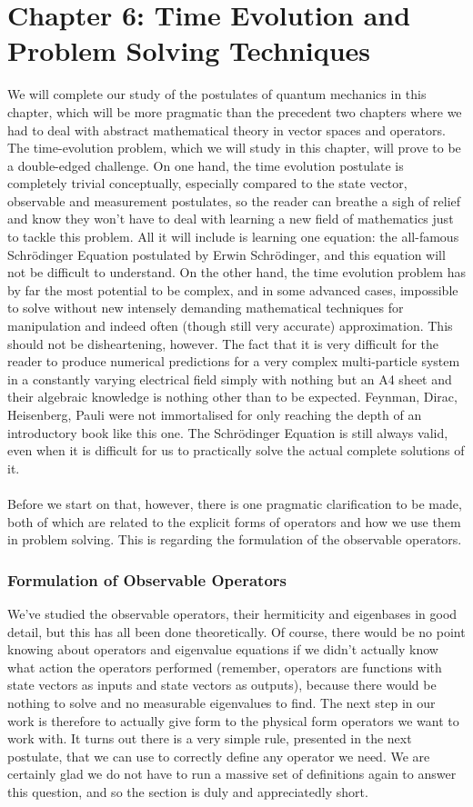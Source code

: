 \chapter{Chapter 6: Time Evolution and Problem Solving Techniques}
We will complete our study of the postulates of quantum mechanics in this chapter, which will be more pragmatic than the precedent two chapters where we had to deal with abstract mathematical theory in vector spaces and operators. The time-evolution problem, which we will study in this chapter, will prove to be a double-edged challenge. On one hand, the time evolution postulate is completely trivial conceptually, especially compared to the state vector, observable and measurement postulates, so the reader can breathe a sigh of relief and know they won't have to deal with learning a new field of mathematics just to tackle this problem. All it will include is learning one equation: the all-famous Schr\"{o}dinger Equation postulated by Erwin Schr\"{o}dinger, and this equation will not be difficult to understand. On the other hand, the time evolution problem has by far the most potential to be complex, and in some advanced cases, impossible to solve without new intensely demanding mathematical techniques for manipulation and indeed often (though still very accurate) approximation. This should not be disheartening, however. The fact that it is very difficult for the reader to produce numerical predictions for a very complex multi-particle system in a constantly varying electrical field simply with nothing but an A4 sheet and their algebraic knowledge is nothing other than to be expected. Feynman, Dirac, Heisenberg, Pauli were not immortalised for only reaching the depth of an introductory book like this one. The Schr\"{o}dinger Equation is still always valid, even when it is difficult for us to practically solve the actual complete solutions of it.
\\\\
Before we start on that, however, there is one pragmatic clarification to be made, both of which are related to the explicit forms of operators and how we use them in problem solving. This is regarding the formulation of the observable operators. 
\subsection{Formulation of Observable Operators}
We've studied the observable operators, their hermiticity and eigenbases in good detail, but this has all been done theoretically. Of course, there would be no point knowing about operators and eigenvalue equations if we didn't actually know what action the operators performed (remember, operators are functions with state vectors as inputs and state vectors as outputs), because there would be nothing to solve and no measurable eigenvalues to find. The next step in our work is therefore to actually give form to the physical form operators we want to work with. It turns out there is a very simple rule, presented in the next postulate, that we can use to correctly define any operator we need. We are certainly glad we do not have to run a massive set of definitions again to answer this question, and so the section is duly and appreciatedly short.
